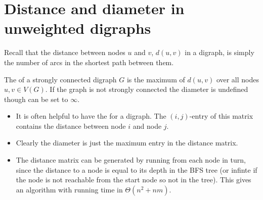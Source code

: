 

\section{Distance and diameter in unweighted digraphs}\label{sec:unweighted}

Recall that the distance between nodes $u$ and $v$, $d(u,v)$ in a digraph, is simply the number of arcs in the shortest path between them. 

\begin{Definition}\label{def:diameter}
The  of a strongly connected digraph $G$ is the
maximum of $d(u,v)$ over all nodes $u, v\in V(G)$. If the graph is not strongly connected the diameter is undefined though can be set to $\infty$.
\end{Definition}



\begin{itemize}
\item It is often helpful to have the  for a digraph.
The $(i, j)$-entry of this matrix contains the distance between node $i$
and node $j$.
\item Clearly the diameter is just the maximum entry in the distance matrix.
\item The distance matrix can be generated by running 
from each node in turn, since the distance to a node is equal to its depth in the BFS tree (or infinte if the node is not reachable from the start node so not in the tree). This gives an algorithm with running time in $\Theta(n^2+nm)$.
\end{itemize}

